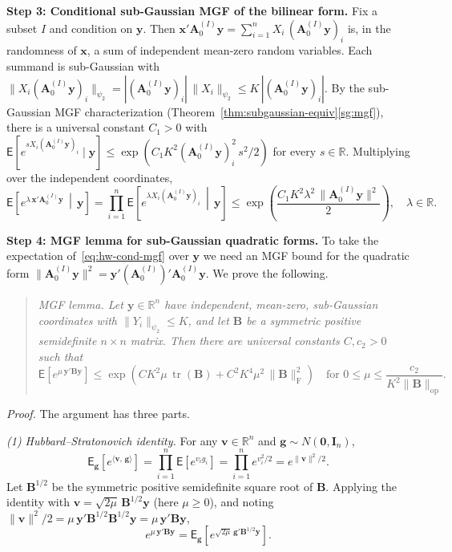 \documentclass[12pt,a4paper]{article}
\makeatletter
\theoremstyle{definition}
\renewenvironment{proof}[1][\proofname]{\par
  \pushQED{\qed}%
  \normalfont \topsep6\p@\@plus6\p@\relax
  \trivlist
  \item[\hskip\labelsep\bfseries #1\@addpunct{.}]\ignorespaces
}{%
  \popQED\endtrivlist\@endpefalse
}
\newcommand\expc{\mathsf{E}}
\DeclareMathOperator\tr{tr}
\newcommand{\by}{\mathbf{y}}
\newcommand{\bx}{\mathbf{x}}
\newcommand{\bI}{\mathbf{I}}
\newcommand{\bzero}{\mathbf{0}}
\newcommand{\bA}{\mathbf{A}}
\newcommand{\bB}{\mathbf{B}}
\newcommand{\bg}{\mathbf{g}}
\newcommand{\bv}{\mathbf{v}}
\newcommand{\Real}{\mathbb{R}}
\newcommand{\ip}[2]{\langle #1,\, #2 \rangle}
\newcommand{\opnorm}[1]{\|#1\|_{\mathrm{op}}}
\newcommand{\fnorm}[1]{\|#1\|_{\mathrm{F}}}
\makeatother
\begin{document}
\begin{proof}
\textbf{Step 3: Conditional sub-Gaussian MGF of the bilinear form.} Fix a subset $I$ and condition on $\by$. Then $\bx'\bA_0^{(I)}\by = \sum_{i=1}^n X_i\,(\bA_0^{(I)}\by)_i$ is, in the randomness of $\bx$, a sum of independent mean-zero random variables. Each summand is sub-Gaussian with $\|X_i(\bA_0^{(I)}\by)_i\|_{\psi_2} = |(\bA_0^{(I)}\by)_i|\,\|X_i\|_{\psi_2} \leqslant K\,|(\bA_0^{(I)}\by)_i|$. By the sub-Gaussian MGF characterization (Theorem~\ref{thm:subgaussian-equiv}\ref{sg:mgf}), there is a universal constant $C_1 > 0$ with $\expc[e^{s X_i(\bA_0^{(I)}\by)_i} \mid \by] \leqslant \exp(C_1 K^2 (\bA_0^{(I)}\by)_i^2\, s^2/2)$ for every $s \in \Real$. Multiplying over the independent coordinates,
\begin{equation}\label{eq:hw-cond-mgf}
\expc\!\left[e^{\lambda\,\bx'\bA_0^{(I)}\by} \,\middle|\, \by\right] = \prod_{i=1}^n \expc\!\left[e^{\lambda X_i(\bA_0^{(I)}\by)_i} \,\middle|\, \by\right] \leqslant \exp\!\left(\frac{C_1 K^2 \lambda^2 \,\|\bA_0^{(I)}\by\|^2}{2}\right), \quad \lambda \in \Real.
\end{equation}

\textbf{Step 4: MGF lemma for sub-Gaussian quadratic forms.} To take the expectation of~\eqref{eq:hw-cond-mgf} over $\by$ we need an MGF bound for the quadratic form $\|\bA_0^{(I)}\by\|^2 = \by'(\bA_0^{(I)})'\bA_0^{(I)}\by$. We prove the following.

\begin{quote}
\emph{MGF lemma. Let $\by \in \Real^n$ have independent, mean-zero, sub-Gaussian coordinates with $\|Y_i\|_{\psi_2} \leqslant K$, and let $\bB$ be a symmetric positive semidefinite $n \times n$ matrix. Then there are universal constants $C, c_2 > 0$ such that}
\begin{equation}\label{eq:hw-mgf-quadratic}
\expc\!\left[e^{\mu\,\by'\bB\by}\right] \leqslant \exp\!\left(C K^2\mu\,\tr(\bB) + C^2 K^4\mu^2\,\fnorm{\bB}^2\right) \quad \text{for } 0 \leqslant \mu \leqslant \frac{c_2}{K^2\opnorm{\bB}}.
\end{equation}
\end{quote}

\emph{Proof.} The argument has three parts.

\emph{(1) Hubbard--Stratonovich identity.} For any $\bv \in \Real^n$ and $\bg \sim N(\bzero, \bI_n)$,
\[
\expc_\bg\!\left[e^{\ip{\bv}{\bg}}\right] = \prod_{i=1}^n \expc[e^{v_i g_i}] = \prod_{i=1}^n e^{v_i^2/2} = e^{\|\bv\|^2/2}.
\]
Let $\bB^{1/2}$ be the symmetric positive semidefinite square root of $\bB$. Applying the identity with $\bv = \sqrt{2\mu}\,\bB^{1/2}\by$ (here $\mu \geqslant 0$), and noting $\|\bv\|^2/2 = \mu\,\by'\bB^{1/2}\bB^{1/2}\by = \mu\,\by'\bB\by$,
\begin{equation}\label{eq:hw-hubbard}
e^{\mu\,\by'\bB\by} = \expc_\bg\!\left[e^{\sqrt{2\mu}\,\bg'\bB^{1/2}\by}\right].
\end{equation}


\end{proof}
\end{document}

